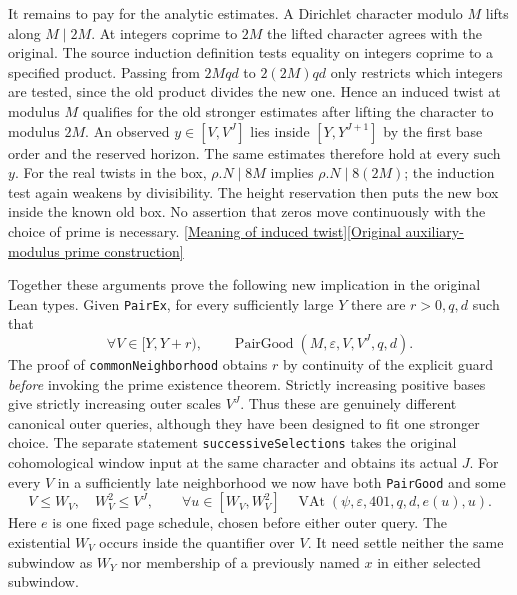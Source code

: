 \documentclass[12pt,letterpaper]{article}
\begin{document}
It remains to pay for the analytic estimates. A Dirichlet character modulo \(M\) lifts along \(M\mid 2M\). At integers coprime to \(2M\) the lifted character agrees with the original. The source induction definition tests equality on integers coprime to a specified product. Passing from \(2Mqd\) to \(2(2M)qd\) only restricts which integers are tested, since the old product divides the new one. Hence an induced twist at modulus \(M\) qualifies for the old stronger estimates after lifting the character to modulus \(2M\). An observed \(y\in[V,V^J]\) lies inside \([Y,Y^{J+1}]\) by the first base order and the reserved horizon. The same estimates therefore hold at every such \(y\). For the real twists in the box, \(\rho.N\mid8M\) implies \(\rho.N\mid8(2M)\); the induction test again weakens by divisibility. The height reservation then puts the new box inside the known old box. No assertion that zeros move continuously with the choice of prime is necessary. \href{https://github.com/nousentllc/riemann-hypothesis/blob/40e56bab026552e089d7afcfeff08d2defb9c005/src/Formalism/SharpRestriction/RamificationFrobenius/TotientGaloisClasses/Analytic.lean#L26-L30}{[Meaning of induced twist]}\quad\href{https://github.com/nousentllc/riemann-hypothesis/blob/40e56bab026552e089d7afcfeff08d2defb9c005/src/Development/AutomorphicArithmetic/MeanSquareBounds/pairEx.lean#L112-L130}{[Original auxiliary-modulus prime construction]}

Together these arguments prove the following new implication in the original Lean types. Given \texttt{PairEx}, for every sufficiently large \(Y\) there are \(r>0,q,d\) such that
\[
   \forall V\in[Y,Y+r),\qquad
       \operatorname{PairGood}(M,\varepsilon,V,V^J,q,d).
\]
The proof of \texttt{commonNeighborhood} obtains \(r\) by continuity of the explicit guard \emph{before} invoking the prime existence theorem. Strictly increasing positive bases give strictly increasing outer scales \(V^J\). Thus these are genuinely different canonical outer queries, although they have been designed to fit one stronger choice. The separate statement \texttt{successiveSelections} takes the original cohomological window input at the same character and obtains its actual \(J\). For every \(V\) in a sufficiently late neighborhood we now have both \texttt{PairGood} and some
\[
 V\le W_V,\quad W_V^2\le V^J,\qquad
 \forall u\in[W_V,W_V^2]\quad
      \operatorname{VAt}(\psi,\varepsilon,401,q,d,e(u),u).
\]
Here \(e\) is one fixed page schedule, chosen before either outer query. The existential \(W_V\) occurs inside the quantifier over \(V\). It need settle neither the same subwindow as \(W_Y\) nor membership of a previously named \(x\) in either selected subwindow.
\end{document}
